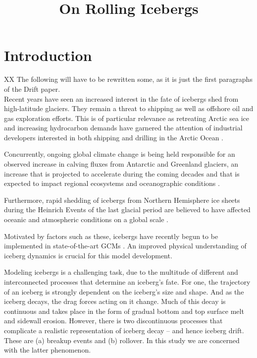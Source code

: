 \documentclass[twocol]{ametsoc_tw}
\title{On Rolling Icebergs}
\affiliation{University of California San Diego, La Jolla, California}
\begin{document}
\maketitle
\section{Introduction} \label{sec:intro}

XX The following will have to be rewritten some, as it is just the first paragraphs of the Drift paper. 
 \\
 
Recent years have seen an increased interest in the fate of icebergs shed from high-latitude glaciers. They remain a threat to shipping as well as offshore oil and gas exploration efforts. This is of particular relevance as retreating Arctic sea ice and increasing hydrocarbon demands have garnered the attention of industrial developers interested in both shipping and drilling in the Arctic Ocean \citep{Pizzolato:2014cy, NationalEnergyBoardCanada:UUcm8XfS}. 

Concurrently, ongoing global climate change is being held responsible for an observed increase in calving fluxes from Antarctic and Greenland glaciers, an increase that is projected to accelerate during the coming decades \citep[e.g.,][]{Rignot:2006fm, Copland:2007du, Rignot:2011hi,Joughin:2014ew} and that is expected to impact regional ecosystems and oceanographic conditions \citep[e.g.,][]{Vernet:2012th,Smith:2013cu,Stern:2015bo,Duprat:2016hw}. 

Furthermore, rapid shedding of icebergs from Northern Hemisphere ice sheets during the Heinrich Events of the last glacial period are believed to have affected oceanic and atmospheric conditions on a global scale \citep[see reviews in][]{Hemming:2004in,Stokes:2015dt}.

Motivated by factors such as these, icebergs have recently begun to be implemented in state-of-the-art GCMs \citep[e.g.,][]{Hunke:2011fx, Stern:2016kh}. An improved physical understanding of iceberg dynamics is crucial for this model development.

Modeling icebergs is a challenging task, due to the multitude of different and interconnected processes that determine an iceberg's fate. 
For one, the trajectory of an iceberg is strongly dependent on the iceberg's size and shape. And as the iceberg decays, the drag forces acting on it change. Much of this decay is continuous and takes place in the form of gradual bottom and top surface melt and sidewall erosion. However, there is two discontinuous processes that complicate a realistic representation of iceberg decay -- and hence iceberg drift. These are (a) breakup events and (b) rollover. In this study we are concerned with the latter phenomenon. 
\end{document}
